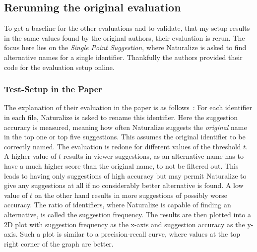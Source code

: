 \subsection{Rerunning the original evaluation}
To get a baseline for the other evaluations and to validate, that my setup results in the same values found
by the original authors, their evaluation is rerun. The focus here lies on the \emph{Single Point Suggestion},
where Naturalize is asked to find alternative names for a single identifier. Thankfully the authors provided
their code for the evaluation setup online.

\subsubsection{Test-Setup in the Paper}
The explanation of their evaluation in the paper is as follows~\cite{naturalize}:
For each identifier in each file, Naturalize is asked to rename this identifier.
Here the suggestion accuracy is measured, meaning how often Naturalize suggests the \emph{original} name in the top one
or top five suggestions. This assumes the original identifier to be correctly named.
The evaluation is redone for different values of the threshold $t$. A higher value of $t$ results in viewer
suggestions, as an alternative name has to have a much higher score than the original name, to not be
filtered out. This leads to having only suggestions of high accuracy but may permit Naturalize to give
any suggestions at all if no considerably better alternative is found. A low value of $t$ on the other hand results in
more suggestions of possibly worse accuracy.
The ratio of identifiers, where Naturalize is capable of finding an alternative, is called the suggestion frequency.
The results are then plotted into a 2D plot with suggestion frequency as the x-axis and suggestion accuracy as the y-axis. Such a plot is similar to a precision-recall curve, where values at the top right corner of the graph are better.

